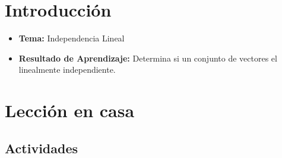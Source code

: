 \documentclass[a4,11pt]{aleph-notas}
\begin{document}
\encabezado

\vspace*{-10mm}
\section*{Introducción}

\begin{itemize}
    \item \textbf{Tema:} Independencia Lineal
    \item \textbf{Resultado de Aprendizaje:} Determina si un conjunto de vectores el linealmente independiente.
\end{itemize}

\section*{Lección en casa}

\subsection*{Actividades}
\end{document}
